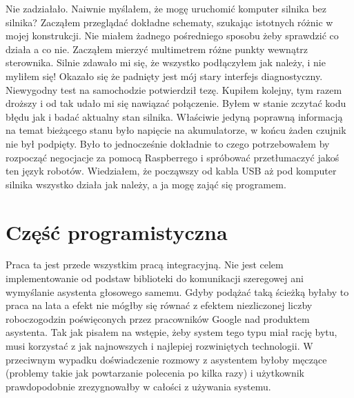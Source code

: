 \documentclass[declaration,shortabstract, inz]{iithesis}
\begin{document}
    Nie zadziałało. Naiwnie myślałem, że mogę uruchomić komputer silnika bez silnika? Zacząłem przeglądać dokładne schematy, szukając istotnych różnic w mojej konstrukcji. Nie miałem żadnego pośredniego sposobu żeby sprawdzić co działa a co nie. Zacząłem mierzyć multimetrem różne punkty wewnątrz sterownika. Silnie zdawało mi się, że wszystko podłączyłem jak należy, i nie myliłem się! Okazało się że padnięty jest mój stary interfejs diagnostyczny. Niewygodny test na samochodzie potwierdził tezę. Kupiłem kolejny, tym razem droższy i od tak udało mi się nawiązać połączenie. Byłem w stanie zczytać kodu błędu jak i badać aktualny stan silnika. Właściwie jedyną poprawną informacją na temat bieżącego stanu było napięcie na akumulatorze, w końcu żaden czujnik nie był podpięty. Było to jednocześnie dokładnie to czego potrzebowałem by rozpocząć negocjacje za pomocą Raspberrego i spróbować przetłumaczyć jakoś ten język robotów. Wiedziałem, że począwszy od kabla USB aż pod komputer silnika wszystko działa jak należy, a ja mogę zająć się programem.

\section{Część programistyczna}
    Praca ta jest przede wszystkim pracą integracyjną. Nie jest celem implementowanie od podstaw biblioteki do komunikacji szeregowej ani wymyślanie asystenta głosowego samemu. Gdyby podążać taką ścieżką byłaby to praca na lata a efekt nie mógłby się równać z efektem niezliczonej liczby roboczogodzin poświęconych przez pracowników Google nad produktem asystenta. Tak jak pisałem na wstępie, żeby system tego typu miał rację bytu, musi korzystać z jak najnowszych i najlepiej rozwiniętych technologii. W przeciwnym wypadku doświadczenie rozmowy z asystentem byłoby męczące (problemy takie jak powtarzanie polecenia po kilka razy) i użytkownik prawdopodobnie zrezygnowałby w całości z używania systemu. 
    
\end{document}

